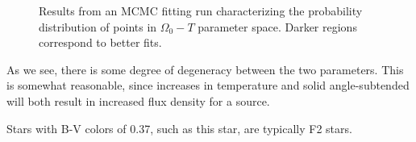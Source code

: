 \documentclass[12pt]{article}
\newenvironment{answer}[2][Answer]{\begin{trivlist}
\item[\hskip \labelsep {\bfseries #1}\hskip \labelsep {\bfseries #2.}]}{\end{trivlist}}
\begin{document}
\begin{answer}{2}
  \begin{figure}[htp]
    \hspace*{\fill}%
    \hfill%
    \hfill%
    \hspace*{\fill}%
    \caption{Results from an MCMC fitting run characterizing the probability distribution of points in $\Omega_0-T$ parameter space. Darker regions correspond to better fits.}
  \end{figure}

  As we see, there is some degree of degeneracy between the two parameters. This is somewhat reasonable, since increases in temperature and solid angle-subtended will both result in increased flux density for a source.


  Stars with B-V colors of 0.37, such as this star, are typically F2 stars.
\end{answer}
\end{document}
